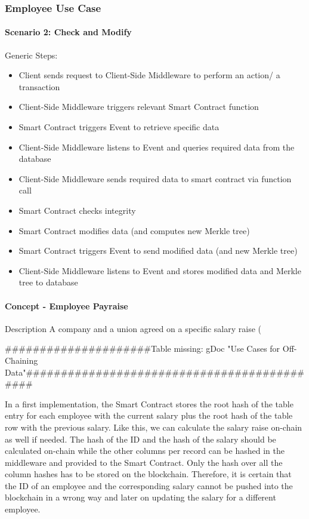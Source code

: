 \subsubsection{Employee Use Case}
\paragraph{Scenario 2: Check and Modify}
Generic Steps:
\begin{itemize}
\item Client sends request to Client-Side Middleware to perform an action/ a transaction
\item Client-Side Middleware triggers relevant Smart Contract function
\item Smart Contract triggers Event to retrieve specific data
\item Client-Side Middleware listens to Event and queries required data from the database
\item Client-Side Middleware sends required data to smart contract via function call
\item Smart Contract checks integrity
\item Smart Contract modifies data (and computes new Merkle tree)
\item Smart Contract triggers Event to send modified data (and new Merkle tree)
\item Client-Side Middleware listens to Event and stores modified data and Merkle tree to database
\end{itemize}

\paragraph{Concept - Employee Payraise}
Description
A company and a union agreed on a specific salary raise (%

#####################Table missing: gDoc "Use Cases for Off-Chaining Data"############################################

In a first implementation, the Smart Contract stores the root hash of the table entry for each employee with the current salary plus the root hash of the table row with the previous salary. Like this, we can calculate the salary raise on-chain as well if needed.
The hash of the ID and the hash of the salary should be calculated on-chain while the other columns per record can be hashed in the middleware and provided to the Smart Contract. Only the hash over all the column hashes has to be stored on the blockchain. Therefore, it is certain that the ID of an employee and the corresponding salary cannot be pushed into the blockchain in a wrong way and later on updating the salary for a different employee.

